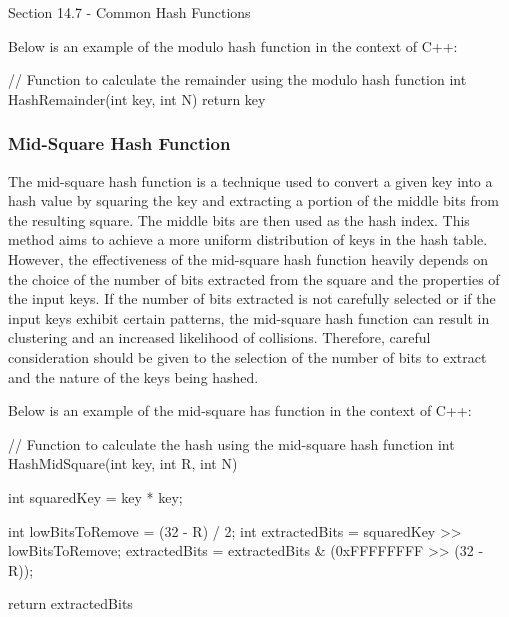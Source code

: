 \begin{notes}{Section 14.7 - Common Hash Functions}
    \begin{highlight}
        Below is an example of the modulo hash function in the context of C++:
    
    \begin{code}[C++]
    // Function to calculate the remainder using the modulo hash function
    int HashRemainder(int key, int N) {
        return key %
    }
    \end{code}
    \end{highlight}
    
    \subsubsection*{Mid-Square Hash Function}
    
    The mid-square hash function is a technique used to convert a given key into a hash value by squaring the key and extracting a portion of the middle bits from the resulting square. The middle bits are then used as 
    the hash index. This method aims to achieve a more uniform distribution of keys in the hash table. However, the effectiveness of the mid-square hash function heavily depends on the choice of the number of bits 
    extracted from the square and the properties of the input keys. If the number of bits extracted is not carefully selected or if the input keys exhibit certain patterns, the mid-square hash function can result in 
    clustering and an increased likelihood of collisions. Therefore, careful consideration should be given to the selection of the number of bits to extract and the nature of the keys being hashed.
    
    \begin{highlight}
        Below is an example of the mid-square has function in the context of C++:
    
    \begin{code}[C++]
    // Function to calculate the hash using the mid-square hash function
    int HashMidSquare(int key, int R, int N) {
        int squaredKey = key * key;
    
        int lowBitsToRemove = (32 - R) / 2;
        int extractedBits = squaredKey >> lowBitsToRemove;
        extractedBits = extractedBits & (0xFFFFFFFF >> (32 - R));
    
        return extractedBits %
    }
    \end{code}
    \end{highlight}
    

\end{notes}
